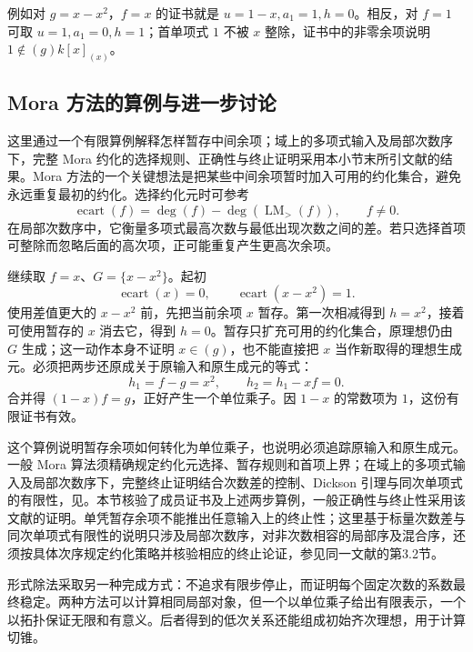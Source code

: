 \ProseParagraphBreak
例如对 \(g=x-x^2\)，\(f=x\) 的证书就是 \(u=1-x,a_1=1,h=0\)。相反，对 \(f=1\) 可取 \(u=1,a_1=0,h=1\)；首单项式 \(1\) 不被 \(x\) 整除，证书中的非零余项说明 \(1\notin(g)k[x]_{(x)}\)。

\subsection{Mora 方法的算例与进一步讨论}
\label{b3:subsec:F02:03}

这里通过一个有限算例解释怎样暂存中间余项；域上的多项式输入及局部次数序下，完整 Mora 约化的选择规则、正确性与终止证明采用本小节末所引文献的结果。Mora 方法的一个关键想法是把某些中间余项暂时加入可用的约化集合，避免永远重复最初的约化。选择约化元时可参考
\[
	\operatorname{ecart}(f)=\deg(f)-\deg(\operatorname{LM}_{>}(f)), \qquad f\ne0.
\]
在局部次数序中，它衡量多项式最高次数与最低出现次数之间的差。若只选择首项可整除而忽略后面的高次项，正可能重复产生更高次余项。

\begin{example}\label{b3:exm:F-mora-one-step}
	继续取 \(f=x\)、\(G=\{x-x^2\}\)。起初
	\[
		\operatorname{ecart}(x)=0,\qquad \operatorname{ecart}(x-x^2)=1.
	\]
	使用差值更大的 \(x-x^2\) 前，先把当前余项 \(x\) 暂存。第一次相减得到 \(h=x^2\)，接着可使用暂存的 \(x\) 消去它，得到 \(h=0\)。暂存只扩充可用的约化集合，原理想仍由 \(G\) 生成；这一动作本身不证明 \(x\in(g)\)，也不能直接把 \(x\) 当作新取得的理想生成元。必须把两步还原成关于原输入和原生成元的等式：
	\[
		h_1=f-g=x^2,\qquad h_2=h_1-xf=0.
	\]
	合并得 \((1-x)f=g\)，正好产生一个单位乘子。因 \(1-x\) 的常数项为 \(1\)，这份有限证书有效。
\end{example}

这个算例说明暂存余项如何转化为单位乘子，也说明必须追踪原输入和原生成元。一般 Mora 算法须精确规定约化元选择、暂存规则和首项上界；在域上的多项式输入及局部次数序下，完整终止证明结合次数差的控制、Dickson 引理与同次单项式的有限性，见\cite[Section 3.1, Lemmas 10--11 and Corollary 2]{MoraPfisterTraverso1989TangentCone}。本节核验了成员证书及上述两步算例，一般正确性与终止性采用该文献的证明。单凭暂存余项不能推出任意输入上的终止性；这里基于标量次数差与同次单项式有限性的说明只涉及局部次数序，对非次数相容的局部序及混合序，还须按具体次序规定约化策略并核验相应的终止论证，参见同一文献的第3.2节。

\ProseParagraphBreak
形式除法采取另一种完成方式：不追求有限步停止，而证明每个固定次数的系数最终稳定。两种方法可以计算相同局部对象，但一个以单位乘子给出有限表示，一个以拓扑保证无限和有意义。后者得到的低次关系还能组成初始齐次理想，用于计算切锥。
